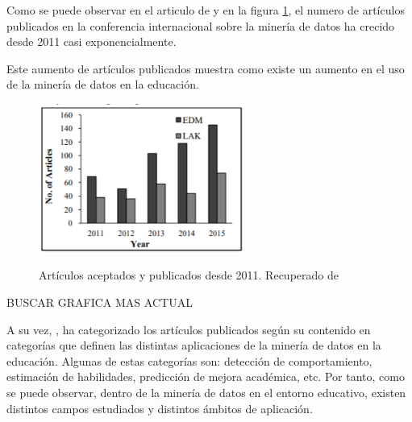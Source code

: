Como se puede observar en el articulo de  y en la figura \ref{fig:artPublicados}, el numero de artículos publicados en la conferencia internacional sobre la minería de datos ha crecido desde 2011 casi exponencialmente.

Este aumento de artículos publicados muestra como existe un aumento en el uso de la minería de datos en la educación.

\begin{figure}[htb]
	\centering
	\caption{Artículos aceptados y publicados desde 2011. Recuperado de \protect{}}
	\includegraphics[width=0.6\textwidth]{recursos/artPublicados}
	\label{fig:artPublicados}
\end{figure}
\FloatBarrier

BUSCAR GRAFICA MAS ACTUAL

A su vez, , ha categorizado los artículos publicados según su contenido en categorías que definen las distintas aplicaciones de la minería de datos en la educación. Algunas de estas categorías son: detección de comportamiento, estimación de habilidades, predicción de mejora académica, etc. Por tanto, como se puede observar, dentro de la minería de datos en el entorno educativo, existen distintos campos estudiados y distintos ámbitos de aplicación.


